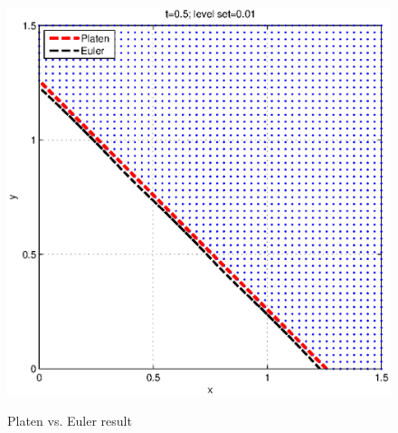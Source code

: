 \documentclass[a4paper,10pt]{article}
\begin{document}
\begin{figure}[ht]
{\includegraphics[scale=0.3]{put_weighted_vs.eps}
}
\caption[Payoff ]{Platen vs. Euler result}
\label{fig:other_payoof}
\end{figure}
\end{document}
